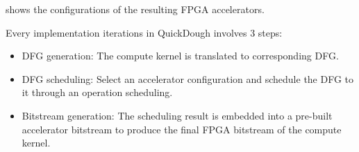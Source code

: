  shows the configurations of the resulting
FPGA accelerators. 

\begin{table}
\centering
\caption{Accelerators generated using QuickDough \label{tab:final-acc-config}}{
}
\end{table}

Every implementation iterations in QuickDough involves 3 steps:
\begin{itemize}[label=\textbullet,leftmargin=2em,rightmargin=\leftmargin]
\item DFG generation: The compute kernel is translated to corresponding DFG.
\item DFG scheduling: Select an accelerator configuration and schedule the DFG to it through an
    operation scheduling. 
\item Bitstream generation: The scheduling result is embedded into a pre-built accelerator bitstream 
to produce the final FPGA bitstream of the compute kernel.
\end{itemize}

